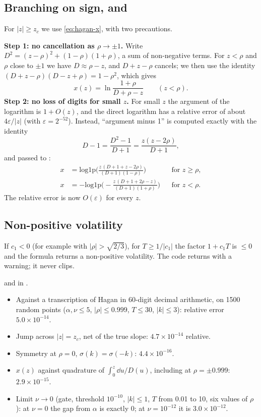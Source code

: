 \subsection{Branching on sign, and }
For $|z|\ge z_c$ we use \eqref{eq:hagan-x}, with two precautions.

\noindent\textbf{Step 1: no cancellation as $\rho\to\pm1$.} Write $D^2=(z-\rho)^2+(1-\rho)(1+\rho)$, a sum of
non-negative terms. For $z<\rho$ and $\rho$ close to $\pm1$ we have $D\approx\rho-z$, and $D+z-\rho$ cancels; we then
use the identity $(D+z-\rho)(D-z+\rho)=1-\rho^2$, which gives
\[
x(z)=\ln\frac{1+\rho}{D+\rho-z}\qquad(z<\rho).
\]
\noindent\textbf{Step 2: no loss of digits for small $z$.} For small $z$ the argument of the logarithm is $1+O(z)$,
and the direct logarithm has a relative error of about $4\varepsilon/|z|$ (with $\varepsilon=2^{-52}$). Instead,
``argument minus 1'' is computed exactly with the identity
\[
D-1=\frac{D^2-1}{D+1}=\frac{z(z-2\rho)}{D+1},
\]
and passed to :
\begin{align*}
x&=\mathrm{log1p}\Big(\frac{z\,(D+1+z-2\rho)}{(D+1)(1-\rho)}\Big) &&\text{for } z\ge\rho,\\
x&=-\mathrm{log1p}\Big(-\frac{z\,(D+1+2\rho-z)}{(D+1)(1+\rho)}\Big) &&\text{for } z<\rho.
\end{align*}
The relative error is now $O(\varepsilon)$ for every $z$.

\subsection{Non-positive volatility}
If $c_1<0$ (for example with $|\rho|>\sqrt{2/3}$), for $T\ge1/|c_1|$ the factor $1+c_1T$ is $\le0$ and the formula
returns a non-positive volatility. The code returns  with a warning; it never clips.

\begin{progetto}[title={In the qpricer project: checks of the formula}]
 and  in .
\begin{itemize}
\item Against a transcription of Hagan in 60-digit decimal arithmetic, on 1500 random points ($\alpha,\nu\le5$,
$|\rho|\le0.999$, $T\le30$, $|k|\le3$): relative error $5.0\times10^{-14}$.
\item Jump across $|z|=z_c$, net of the true slope: $4.7\times10^{-14}$ relative.
\item Symmetry at $\rho=0$, $\sigma(k)=\sigma(-k)$: $4.4\times10^{-16}$.
\item $x(z)$ against quadrature of $\int_0^z\dd u/D(u)$, including at $\rho=\pm0.999$: $2.9\times10^{-15}$.
\item Limit $\nu\to0$ (gate, threshold $10^{-10}$, $|k|\le1$, $T$ from 0.01 to 10, six values of $\rho$): at $\nu=0$
the gap from $\alpha$ is exactly 0; at $\nu=10^{-12}$ it is $3.0\times10^{-12}$.
\end{itemize}
\end{progetto}

